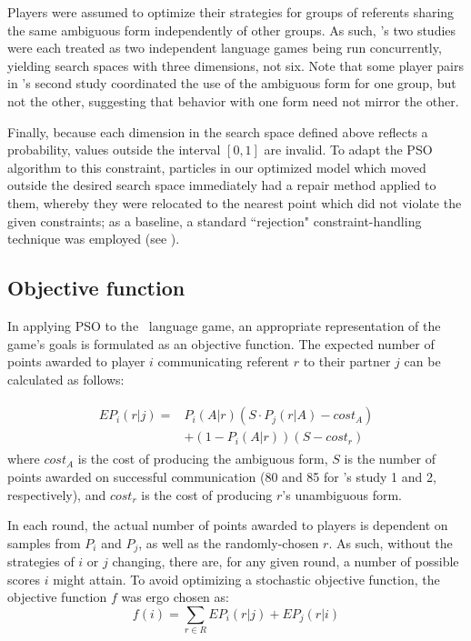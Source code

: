 \documentclass[a4paper,11pt]{article}
\begin{document}
Players were assumed to optimize their strategies for groups of referents sharing the same ambiguous form independently of other groups. As such, \citeauthor{rohde2012}'s two studies were each treated as two independent language games being run concurrently, yielding search spaces with three dimensions, not six. Note that some player pairs in \citeauthor{rohde2012}'s second study coordinated the use of the ambiguous form for one group, but not the other, suggesting that behavior with one form need not mirror the other.

Finally, because each dimension in the search space defined above reflects a probability, values outside the interval $[0, 1]$ are invalid. To adapt the PSO algorithm to this constraint, particles in our optimized model which moved outside the desired search space immediately had a repair method applied to them, whereby they were relocated to the nearest point which did not violate the given constraints; as a baseline, a standard ``rejection" constraint-handling technique was employed (see ).
 
\subsection{Objective function}
\label{sec:objective_func}
In applying PSO to the \citeauthor{rohde2012}\ language game, an appropriate representation of the game's goals is formulated as an objective function. The expected number of points awarded to player $i$ communicating referent $r$ to their partner $j$ can be calculated as follows:

\begin{multline}
\begin{split}
EP_{i}(r|j) = & P_i(A|r)(S \cdot P_j(r|A) - cost_A) \\
              & + (1 - P_i(A|r))(S - cost_r) 
\end{split}
\end{multline}
where $cost_A$ is the cost of producing the ambiguous form, $S$ is the number of points awarded on successful communication (80 and 85 for \citeauthor{rohde2012}'s study 1 and 2, respectively), and $cost_r$ is the cost of producing $r$'s unambiguous form.

In each round, the actual number of points awarded to players is dependent on samples from $P_i$ and $P_j$, as well as the randomly-chosen $r$. As such, without the strategies of $i$ or $j$ changing, there are, for any given round, a number of possible scores $i$ might attain. To avoid optimizing a stochastic objective function, the objective function $f$ was ergo chosen as:
\begin{equation}
f(i) = \sum_{r \in R} EP_{i}(r|j) + EP_{j}(r|i)
\end{equation}
\end{document}
